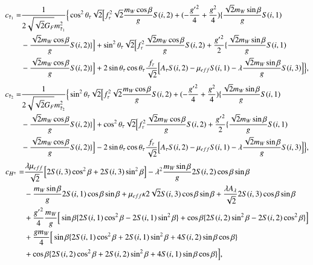\documentclass[final,3p,times]{elsarticle}
\begin{document}
\begin{equation}
\begin{aligned}
c_{\tilde{\tau}_1} = & {1 \over 2\sqrt{\sqrt{2}G_{F}} m_{\tilde{\tau}_1}^2}\Big\{\cos^2 \theta_{\tau} \sqrt{2}\Big[f_{\tau}^2 \sqrt{2} {m_{W} \cos\beta \over g} S(i,2) + (-{{g'}^2 \over 4} + {g^2 \over 4}) \{{\sqrt{2} m_{W} \sin\beta \over g} S(i,1) \\ & -{\sqrt{2} m_{W} \cos\beta \over g}S(i,2)\}\Big] + \sin^2 \theta_{\tau} \sqrt{2} \Big[ f_{\tau}^2 {\sqrt{2} m_{W} \cos\beta \over g}S(i,2) + {{g'}^2 \over 2}\{{\sqrt{2} m_{W} \sin\beta \over g}S(i,1) \\ & - {\sqrt{2} m_{W} \cos\beta \over g} S(i,2)\}\Big] + 2\sin\theta_{\tau} \cos\theta_{\tau} {f_{\tau} \over \sqrt{2}}\Big[A_{\tau}S(i,2) - \mu_{eff}S(i,1) - \lambda {\sqrt{2} m_{W} \sin\beta \over g}S(i,3)\Big]\Big\},
\end{aligned}
\end{equation}
\begin{equation}
\begin{aligned}
c_{\tilde{\tau}_2} = & {1 \over 2\sqrt{\sqrt{2}G_{F}} m_{\tilde{\tau}_2}^2}\Big\{\sin^2 \theta_{\tau} \sqrt{2}\Big[f_{\tau}^2 \sqrt{2} {m_{W} \cos\beta \over g} S(i,2) + (-{{g'}^2 \over 4} + {g^2 \over 4}) \{{\sqrt{2} m_{W} \sin\beta \over g} S(i,1) \\ & -{\sqrt{2} m_{W} \cos\beta \over g}S(i,2)\}\Big] + \cos^2 \theta_{\tau} \sqrt{2} \Big[ f_{\tau}^2 {\sqrt{2} m_{W} \cos\beta \over g}S(i,2) + {{g'}^2 \over 2}\{{\sqrt{2} m_{W} \sin\beta \over g}S(i,1) \\ & - {\sqrt{2} m_{W} \cos\beta \over g} S(i,2)\}\Big] - 2\sin\theta_{\tau} \cos\theta_{\tau} {f_{\tau} \over \sqrt{2}}\Big[A_{\tau}S(i,2) - \mu_{eff}S(i,1) - \lambda {\sqrt{2} m_{W} \sin\beta \over g}S(i,3)\Big]\Big\},
\end{aligned}
\end{equation}
\begin{equation}
\begin{aligned}
c_{H^{\pm}} = & {\lambda \mu_{eff} \over \sqrt{2}}\Big[2S(i,3)\cos^2 \beta + 2S(i,3)\sin^2 \beta\Big] - \lambda^2 {m_{W} \sin\beta \over g}2S(i,2)\cos\beta\sin\beta  \\ & - {m_{W} \sin\beta \over g}2S(i,1)\cos\beta\sin\beta + \mu_{eff} \kappa 2\sqrt{2} S(i,3)\cos\beta\sin\beta + {\lambda A_{\lambda} \over \sqrt{2}} 2S(i,3)\cos\beta\sin\beta \\ & + {{g'}^2 \over 4}{m_{W} \over g}\Big[\sin\beta \{2S(i,1)\cos^2 \beta - 2S(i,1) \sin^2 \beta\}  + \cos\beta\{2S(i,2)\sin^2 \beta - 2S(i,2) \cos^2 \beta\}\Big] \\ & + {g m_{W} \over 4}\Big[\sin\beta \{2S(i,1) \cos^2 \beta + 2S(i,1) \sin^2 \beta + 4S(i,2)\sin\beta\cos\beta\} \\ & + \cos\beta\{2S(i,2)\cos^2  \beta + 2S(i,2) \sin^2 \beta + 4S(i,1)\sin\beta\cos\beta\}\Big],
\end{aligned}
\end{equation}
\end{document}
